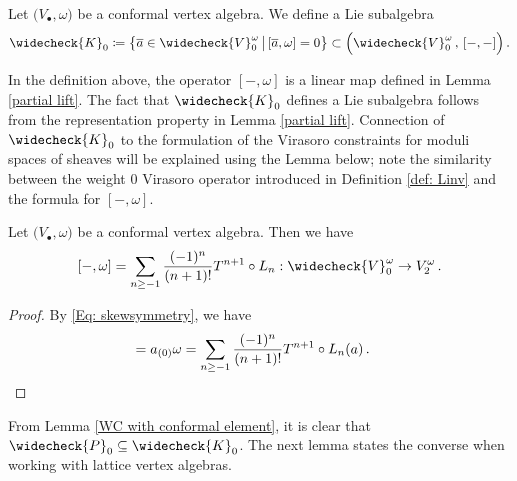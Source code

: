 \documentclass[a4paper, 12pt]{amsart}
\begin{document}
\begin{definition}
Let $\big(V_\bullet,\omega\big)$ be a conformal vertex algebra. We define a Lie subalgebra
$$\widecheck{K}_0\coloneqq \big\{\overline{a}\in \widecheck{V}^\omega_0\,\big|\,[\overline{a},\omega]=0
\big\}\subset\Big(\widecheck{V}^\omega_{0}\,,\, [-,-]\Big)\,.
$$
\end{definition}
In the definition above, the operator $[-,\omega]$ is a linear map defined in Lemma \ref{partial lift}. The fact that $\widecheck{K}_0$ defines a Lie subalgebra follows from the representation property in Lemma \ref{partial lift}. Connection of $\widecheck{K}_0$ to the formulation of the Virasoro constraints for moduli spaces of sheaves will be explained using the Lemma below; note the similarity between the weight 0 Virasoro operator introduced in Definition \ref{def: Linv} and the formula for $[-, \omega]$.
\begin{lemma}\label{WC with conformal element}
Let $\big(V_\bullet,\omega\big)$ be a conformal vertex algebra. Then we have 
$$[-,\omega]=\sum_{n\geq -1}\frac{(-1)^n}{(n+1)!}T^{n+1}\circ L_n:\widecheck{V}_0^\omega\rightarrow V_{2}^\omega\,. 
$$
\end{lemma}
\begin{proof}
By  \eqref{Eq: skewsymmetry}, we have 
\begin{align*}
    [\overline{a},\omega] = a_{(0)}\omega
   =\sum_{n\geq -1}\frac{(-1)^{n}}{(n+1)!}T^{n+1}\circ L_n(a)\,.\quad\qedhere
\end{align*}
\end{proof}

From Lemma \ref{WC with conformal element}, it is clear that $\widecheck{P}_0\subseteq \widecheck{K}_0$. The next lemma states the converse when working with lattice vertex algebras. 
\end{document}
